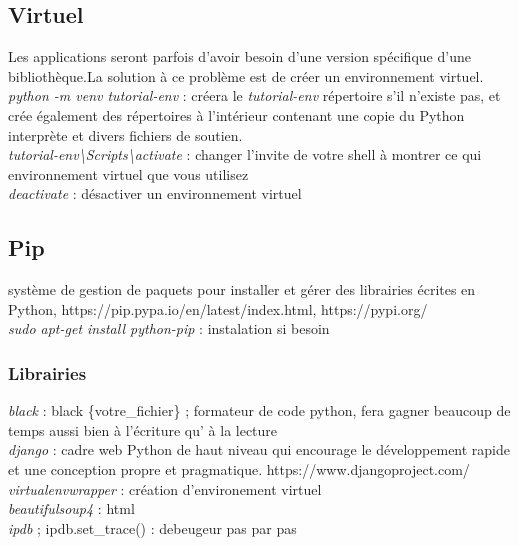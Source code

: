 \documentclass[a4paper,12pt]{report}
\begin{document}
	\subsection{Virtuel}
		Les applications seront parfois d'avoir besoin d'une version spécifique d'une bibliothèque.La solution à ce problème est de créer un environnement virtuel.\\
		\textit{python -m venv tutorial-env} : créera le \textit{tutorial-env} répertoire s'il n'existe pas, et crée également des répertoires à l'intérieur contenant une copie du Python interprète et divers fichiers de soutien.\\
		\textit{tutorial-env\textbackslash Scripts\textbackslash activate} : changer l'invite de votre shell à montrer ce qui environnement virtuel que vous utilisez\\
		\textit{deactivate} : désactiver un environnement virtuel
	\subsection{Pip}
		système de gestion de paquets pour installer et gérer des librairies écrites en Python, 
		https://pip.pypa.io/en/latest/index.html, 
		https://pypi.org/\\
		\textit{sudo apt-get install python-pip} : instalation si besoin
		\subsubsection{Librairies}
			\textit{black} : black \{votre\_fichier\} ; formateur de code python, fera gagner beaucoup de temps aussi bien à l'écriture qu' à la lecture\\
			\textit{django} : cadre web Python de haut niveau qui encourage le développement rapide et une conception propre et pragmatique. https://www.djangoproject.com/\\
			\textit{virtualenvwrapper} : création d'environement virtuel\\
			\textit{beautifulsoup4} : html\\
			\textit{ipdb} ; ipdb.set\_trace() : debeugeur pas par pas
\end{document}
